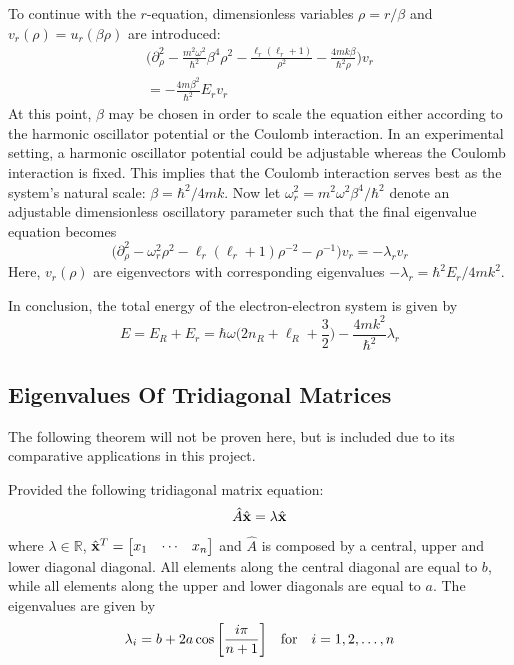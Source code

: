 \documentclass[reprint,english]{revtex4-1}
\begin{document}
To continue with the \(r\)-equation, dimensionless variables \(\rho=r/\beta\) and \(v_r(\rho)=u_r(\beta\rho)\) are introduced:
\begin{align*}
\bigg(\partial_\rho^2-\frac{m^2\omega^2}{\hbar^2}\beta^4\rho^2-\frac{\ell_r(\ell_r+1)}{\rho^2}-\frac{4mk\beta}{\hbar^2\rho}\bigg)v_r\\=-\frac{4m\beta^2}{\hbar^2}E_rv_r
\end{align*}
At this point, \(\beta\) may be chosen in order to scale the equation either according to the harmonic oscillator potential or the Coulomb interaction. In an experimental setting, a harmonic oscillator potential could be adjustable whereas the Coulomb interaction is fixed. This implies that the Coulomb interaction serves best as the system's natural scale: \(\beta=\hbar^2/4mk\). Now let \(\omega_r^2=m^2\omega^2\beta^4/\hbar^2\) denote an adjustable dimensionless oscillatory parameter such that the final eigenvalue equation becomes
\begin{equation}\label{eq:dimless_two_particle_interaction}
\Big(\partial_\rho^2-\omega_r^2\rho^2-\ell_r(\ell_r+1)\rho^{-2}-\rho^{-1}\Big)v_r=-\lambda_rv_r
\end{equation}
Here, \(v_r(\rho)\) are eigenvectors with corresponding eigenvalues \(-\lambda_r=\hbar^2E_r/4mk^2\).

In conclusion, the total energy of the electron-electron system is given by
\begin{equation}
E=E_R+E_r=\hbar\omega\bigg(2n_R+\ell_R+\frac{3}{2}\bigg)-\frac{4mk^2}{\hbar^2}\lambda_r
\end{equation}

\subsection{Eigenvalues Of Tridiagonal Matrices}
The following theorem will not be proven here, but is included due to its comparative applications in this project.

Provided the following tridiagonal matrix equation:
\begin{equation}
\hat{A}\hat{\vb{x}}=\lambda\hat{\vb{x}}
\end{equation}
where \(\lambda\in\mathbb{R}\), \(\hat{\vb{x}}^T=\mqty[x_1&\cdots&x_n]\) and \(\hat{A}\) is composed by a central, upper and lower diagonal diagonal. All elements along the central diagonal are equal to \(b\), while all elements along the upper and lower diagonals are equal to \(a\).
The eigenvalues are given by
\begin{equation}\label{eq:tridiag_matrix_equation_eigenvalues}
\lambda_i=b+2a\cos\bigg[\frac{i\pi}{n+1}\bigg]\qfor i=1,2,\ldots,n
\end{equation}
\end{document}
